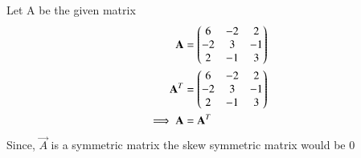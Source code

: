Let A be the given matrix\\
\begin{align}
    \mathbf{A}&=\begin{pmatrix}6&-2&2\\-2&3&-1\\2&-1&3\end{pmatrix}\\
    \mathbf{A}^T&=\begin{pmatrix}6&-2&2\\-2&3&-1\\2&-1&3\end{pmatrix}\\
    \implies \mathbf{A}&=\mathbf{A}^T\label{aug/2/22/2eq1}
\end{align}
Since, $\vec{A}$ is a symmetric matrix the skew symmetric matrix would be 0
